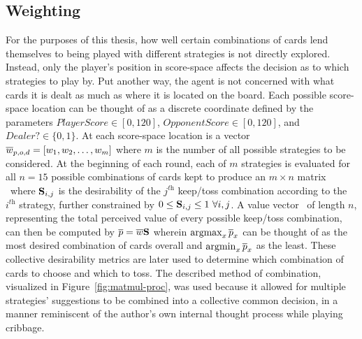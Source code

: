 

\subsection{Weighting}
\label{sec:dm-methods-weighting}



For the purposes of this thesis,
how well certain combinations of cards lend themselves to being played with 
different strategies is not directly explored.
%
Instead, only the player's position in score-space affects the decision as to
which strategies to play by.
%
Put another way, the agent is not concerned with  what cards it is dealt
as much as where it is located on the board.
%
Each possible score-space location can be thought of as a discrete coordinate
defined by the parameters
$\textit{PlayerScore} \in [0, 120]$,
$\textit{OpponentScore} \in [0, 120]$,
and
$\textit{Dealer?} \in \{0,1\}$.
%
At each score-space location is a vector $\overline{w}_{p,o,d} = [w_1,w_2,\ldots,w_m]$
where $m$ is the number of all possible strategies to be considered.
%
At the beginning of each round, each of $m$ strategies is evaluated for all
$n = 15$ possible combinations of cards kept to produce an
$m \times n$ matrix \Smat\
where $\mathbf{S}_{i,j}$ is the desirability of the $j^{\textit{th}}$ keep/toss
combination according to the $i^{\textit{th}}$ strategy,
further constrained by
$0 \le \mathbf{S}_{i,j} \le 1\ \forall i,j$.
%
A value vector \pvec\ of length $n$,
representing the total perceived value of every possible keep/toss combination,
can then be computed by
$\overline{p} = \overline{w} \mathbf{S}$
wherein $\operatorname*{argmax}_{x}{\overline{p}_x}$ can be thought of as the most desired combination
of cards overall and $\operatorname*{argmin}_{x}{\overline{p}_x}$ as the least.
%
These collective desirability metrics are later used to determine which
combination of cards to choose and which to toss.
%
The described method of combination,
visualized in Figure~\ref{fig:matmul-proc},
was used because it allowed for
multiple strategies' suggestions
to be combined into a collective common decision,
in a manner reminiscent of the author's own internal thought process while
playing cribbage.




